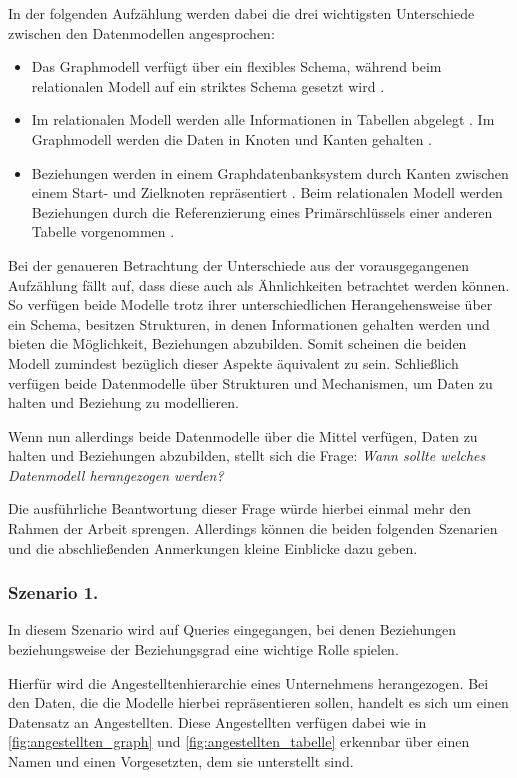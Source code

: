 In der folgenden Aufzählung werden dabei die drei wichtigsten Unterschiede zwischen den Datenmodellen angesprochen:
\begin{itemize}
    \item Das Graphmodell verfügt über ein flexibles Schema, während beim relationalen Modell auf ein striktes Schema gesetzt wird \cite{gdbms,rdbms_book}.
    \item Im relationalen Modell werden alle Informationen in Tabellen abgelegt \cite{rdbms_book}. Im Graphmodell werden die Daten in Knoten und Kanten gehalten \cite{gdbms}. 
    \item Beziehungen werden in einem Graphdatenbanksystem durch Kanten zwischen einem Start- und Zielknoten repräsentiert \cite{gdbms}. Beim relationalen Modell werden Beziehungen durch die Referenzierung eines Primärschlüssels einer anderen Tabelle vorgenommen \cite{rdbms_book}. 
\end{itemize}
Bei der genaueren Betrachtung der Unterschiede aus der vorausgegangenen Aufzählung fällt auf, dass diese auch als Ähnlichkeiten betrachtet werden können. So verfügen beide Modelle trotz ihrer unterschiedlichen Herangehensweise über ein Schema, besitzen Strukturen, in denen Informationen gehalten werden und bieten die Möglichkeit, Beziehungen abzubilden. Somit scheinen die beiden Modell zumindest bezüglich dieser Aspekte äquivalent zu sein. Schließlich verfügen beide Datenmodelle über Strukturen und Mechanismen, um Daten zu halten und Beziehung zu modellieren. 

Wenn nun allerdings beide Datenmodelle über die Mittel verfügen, Daten zu halten und Beziehungen abzubilden, stellt sich die Frage: \textit{Wann sollte welches Datenmodell herangezogen werden?}

Die ausführliche Beantwortung dieser Frage würde hierbei einmal mehr den Rahmen der Arbeit sprengen. Allerdings können die beiden folgenden Szenarien und die abschließenden Anmerkungen kleine Einblicke dazu geben. 

\subsubsection{Szenario 1.}
In diesem Szenario wird auf Queries eingegangen, bei denen Beziehungen beziehungsweise der Beziehungsgrad eine wichtige Rolle spielen. 

Hierfür wird die Angestelltenhierarchie eines Unternehmens herangezogen. Bei den Daten, die die Modelle hierbei repräsentieren sollen, handelt es sich um einen Datensatz an Angestellten. Diese Angestellten verfügen dabei wie in \autoref{fig:angestellten_graph} und \autoref{fig:angestellten_tabelle} erkennbar über einen Namen und einen Vorgesetzten, dem sie unterstellt sind. 

